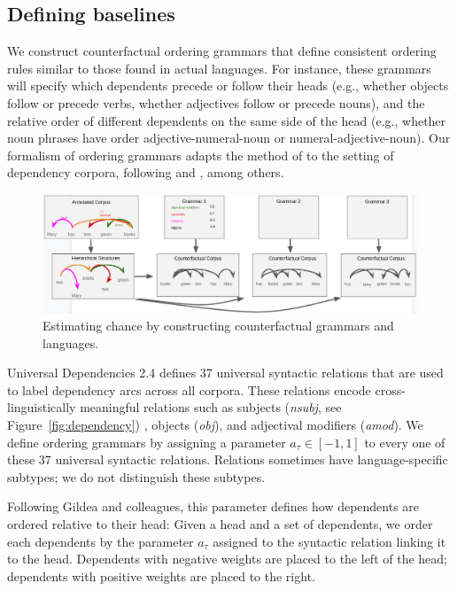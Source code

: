 \subsection{Defining baselines}

We construct counterfactual ordering grammars that define consistent ordering rules similar to those found in actual languages.
For instance, these grammars will specify which dependents precede or follow their heads (e.g., whether objects follow or precede verbs, whether adjectives follow or precede nouns), and the relative order of different dependents on the same side of the head (e.g., whether noun phrases have order adjective-numeral-noun or numeral-adjective-noun). Our formalism of ordering grammars adapts the method of \citet{gildea-optimizing-2007,gildea-grammars-2010,gildea-human-2015} to the setting of dependency corpora, following \citet{futrell-large-scale-2015} and \citet{hahn2020optimization}, among others.


\begin{figure}
\centering
\includegraphics[width=\textwidth]{figures-gdrive/counterfactual-languages.png}
	\caption{ Estimating chance by constructing counterfactual grammars and languages. }\label{fig:grammars}
\end{figure}


Universal Dependencies 2.4 defines 37 universal syntactic relations that are used to label dependency arcs across all corpora.
These relations encode cross-linguistically meaningful relations such as subjects (\textit{nsubj}, see Figure~\ref{fig:dependency}) , objects (\textit{obj}), and adjectival modifiers (\textit{amod}).
We define ordering grammars by assigning a parameter $a_\tau \in [-1,1]$ to every one of these 37 universal syntactic relations.
Relations sometimes have language-specific subtypes; we do not distinguish these subtypes.

Following Gildea and colleagues, this parameter defines how dependents are ordered relative to their head:
Given a head and a set of dependents, we order each dependents by the parameter $a_\tau$ assigned to the syntactic relation linking it to the head.
Dependents with negative weights are placed to the left of the head; dependents with positive weights are placed to the right.

